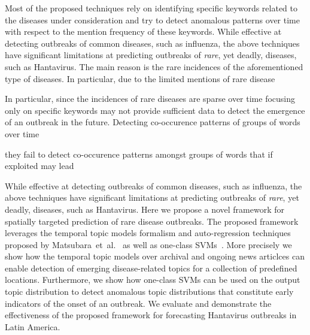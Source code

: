 \documentclass{sig-alternate}
\begin{document}
Most of the proposed techniques rely on identifying specific keywords related to the diseases under consideration and try to detect anomalous patterns over time with respect to the mention frequency of these keywords. While effective at detecting outbreaks of common diseases, such as influenza, the above techniques have significant limitations at predicting outbreaks of {\em rare}, yet deadly, diseases, such as Hantavirus. The main reason is the rare incidences of the aforementioned type of diseases. In particular, due to the limited mentions of rare disease 

In particular, since the incidences of rare diseases are sparse over time focusing only on specific keywords may not provide sufficient data to detect the emergence of an outbreak in the future. Detecting co-occurence patterns of groups of words over time 

 they fail to detect co-occurence patterns amongst groups of words that if exploited may lead 


While effective at detecting outbreaks of common diseases, such as influenza,  the above techniques have significant limitations at predicting outbreaks of {\em rare},  yet deadly, diseases, such as Hantavirus. Here we propose a novel framework for spatially targeted prediction of rare disease outbreaks. %
The proposed framework leverages the temporal topic models formalism
and auto-regression techniques proposed by Matsubara~et~al.~\cite{matsubara:2012} as well as one-class SVMs~\cite{schoelkopf:99}. More precisely we show how the temporal topic models 
over archival and ongoing news articlces can enable 
detection of emerging disease-related topics for a collection of predefined locations. 
Furthermore, we show how one-class SVMs can be used on the output topic distribution 
to detect anomalous topic distributions that constitute early indicators of the 
onset of an outbreak. We evaluate and demonstrate the effectiveness of the proposed 
framework for forecasting Hantavirus outbreaks in Latin America.
\end{document}
